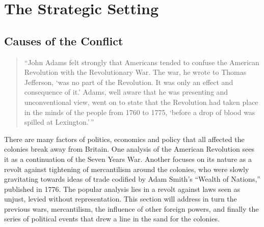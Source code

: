 \newpage
\section{The Strategic Setting}

\subsection{Causes of the Conflict}


\begin{quote}
  ``John Adams felt strongly that Americans tended to confuse the American 
  Revolution with the Revolutionary War. The war, he wrote to Thomas Jefferson,
  `was no part of the Revolution. It was only an effect and consequence of it.'
  Adams, well aware that he was presenting and unconventional view, went on to
  state that the Revolution had taken place in the minds of the people from 1760
  to 1775, `before a drop of blood was spilled at
  Lexington.'\,''\cite[15]{dupuy_1977}
\end{quote}

There are many factors of politics, economics and policy that all affected the
colonies break away from Britain. One analysis of the American Revolution sees it
as a continuation of the Seven Years War. 
Another focuses on its nature as a revolt against tightening of mercantilism
around the colonies, who were slowly gravitating towards ideas of trade codified
by Adam Smith's ``Wealth of Nations,'' published in 1776.
The popular analysis lies in a revolt against laws seen as unjust, levied
without representation. This section will address in turn the previous wars,
mercantilism, the influence of other foreign powers, and finally the series of
political events that drew a line in the sand for the colonies.

